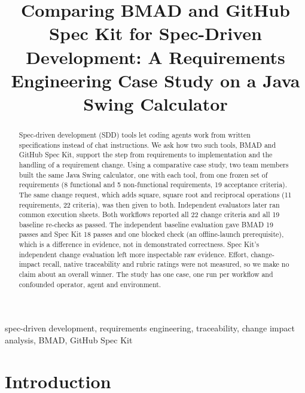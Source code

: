 \documentclass[conference]{IEEEtran}
\begin{document}
\title{Comparing BMAD and GitHub Spec Kit for Spec-Driven Development: A
Requirements Engineering Case Study on a Java Swing Calculator}

\author{
\and
{}
\and
{}
\and
{}
}

\maketitle

\begin{abstract}
Spec-driven development (SDD) tools let coding agents work from written
specifications instead of chat instructions. We ask how two such tools,
BMAD and GitHub Spec Kit, support the step from requirements to
implementation and the handling of a requirement change. Using a
comparative case study, two team members built the same Java Swing
calculator, one with each tool, from one frozen set of requirements (8
functional and 5 non-functional requirements, 19 acceptance criteria).
The same change request, which adds square, square root and reciprocal
operations (11 requirements, 22 criteria), was then given to both.
Independent evaluators later ran common execution sheets. Both workflows
reported all 22 change criteria and all 19 baseline re-checks as passed.
The independent baseline evaluation gave BMAD 19 passes and Spec Kit 18
passes and one blocked check (an offline-launch prerequisite), which is
a difference in evidence, not in demonstrated correctness. Spec Kit's
independent change evaluation left more inspectable raw evidence.
Effort, change-impact recall, native traceability and rubric ratings
were not measured, so we make no claim about an overall winner. The
study has one case, one run per workflow and confounded operator, agent
and environment.
\end{abstract}

\begin{IEEEkeywords}
spec-driven development, requirements engineering, traceability, change
impact analysis, BMAD, GitHub Spec Kit
\end{IEEEkeywords}

\section{Introduction}\label{introduction}
\end{document}

